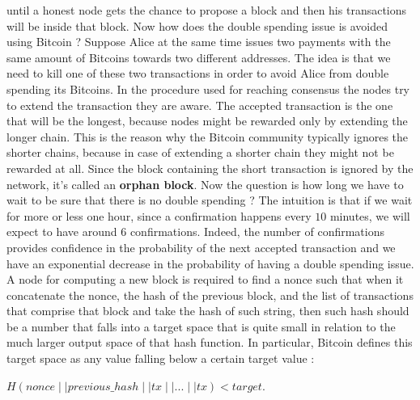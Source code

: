until a honest node gets the chance to propose a block and then his transactions will be inside that block. Now how does the double spending issue is avoided using Bitcoin ? Suppose Alice at the same time issues two payments with the same amount of Bitcoins towards two different addresses. The idea is that we need to kill one of these two transactions in order to avoid Alice from double spending its Bitcoins. In the procedure used for reaching consensus the nodes try to extend the transaction they are aware. The accepted transaction is the one that will be the longest, because nodes might be rewarded only by extending the longer chain. This is the reason why the Bitcoin community typically ignores the shorter chains, because in case of extending a shorter chain they might not be rewarded at all. Since the block containing the short transaction is ignored by the network, it's called an \textbf{orphan block}. Now the question is how long we have to wait to be sure that there is no double spending ? The intuition is that if we wait for more or less one hour, since a confirmation happens every $10$ minutes, we will expect to have around $6$ confirmations. Indeed, the number of confirmations provides confidence in the probability of the next accepted transaction and we have an exponential decrease in the probability of having a double spending issue. A node for computing a new block is required to find a nonce such that when it concatenate the nonce, the hash of the previous block, and the list of transactions that comprise that block and take the hash of such string, then such hash should be a number that falls into a target space that is quite small in relation to the much larger output space of that hash function. In particular, Bitcoin defines this target space as any value falling below a certain target value :
\begin{center}
$H(nonce \mid \mid previous\_hash \mid \mid tx \mid \mid ... \mid \mid tx) < target$.
\end{center}
